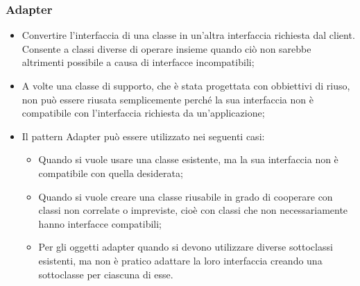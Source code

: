 \subsubsection{Adapter}
\begin{itemize}
\item {} Convertire l'interfaccia di una classe in un'altra interfaccia richiesta dal client. Consente a classi diverse di operare insieme quando ciò non sarebbe altrimenti possibile a causa di interfacce incompatibili;
\item {} A volte una classe di supporto, che è stata progettata con obbiettivi di riuso, non può essere riusata semplicemente perché la sua interfaccia non è compatibile con l'interfaccia richiesta da un'applicazione;
\item {} Il pattern Adapter può essere utilizzato nei seguenti casi:
\begin{itemize}
\item Quando si vuole usare una classe esistente, ma la sua interfaccia non è compatibile con quella desiderata;
\item Quando si vuole creare una classe riusabile in grado di cooperare con classi non correlate o impreviste, cioè con classi che non necessariamente hanno interfacce compatibili;
\item Per gli oggetti adapter quando si devono utilizzare diverse sottoclassi esistenti, ma non è pratico adattare la loro interfaccia creando una sottoclasse per ciascuna di esse.
\end{itemize}
\end{itemize}

